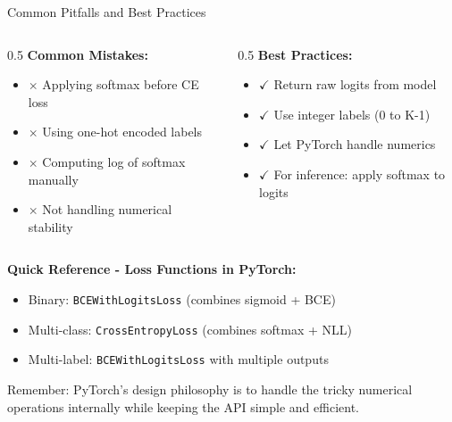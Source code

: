 \documentclass[xcolor=svgnames, 8pt, handout, standalone]{beamer}
\newcommand{\1}{\mathbf{1}}
\begin{document}
\begin{frame}{Common Pitfalls and Best Practices}
\begin{columns}
\begin{column}{0.5\textwidth}
\textbf{Common Mistakes:}
\begin{itemize}
\item $\boldsymbol{\times}$ Applying softmax before CE loss
\item $\boldsymbol{\times}$ Using one-hot encoded labels
\item $\boldsymbol{\times}$ Computing log of softmax manually
\item $\boldsymbol{\times}$ Not handling numerical stability
\end{itemize}
\end{column}
\begin{column}{0.5\textwidth}
\textbf{Best Practices:}
\begin{itemize}
\item $\boldsymbol{\checkmark}$ Return raw logits from model
\item $\boldsymbol{\checkmark}$ Use integer labels (0 to K-1)
\item $\boldsymbol{\checkmark}$ Let PyTorch handle numerics
\item $\boldsymbol{\checkmark}$ For inference: apply softmax to logits
\end{itemize}
\end{column}
\end{columns}

\vspace{1em}
\textbf{Quick Reference - Loss Functions in PyTorch:}
\begin{itemize}
\item Binary: \texttt{BCEWithLogitsLoss} (combines sigmoid + BCE)
\item Multi-class: \texttt{CrossEntropyLoss} (combines softmax + NLL)
\item Multi-label: \texttt{BCEWithLogitsLoss} with multiple outputs
\end{itemize}

\begin{tcolorbox}[colback=lightblue, colframe=deepblue, boxrule=1pt]
Remember: PyTorch's design philosophy is to handle the tricky numerical operations internally while keeping the API simple and efficient.
\end{tcolorbox}
\end{frame}
\end{document}

